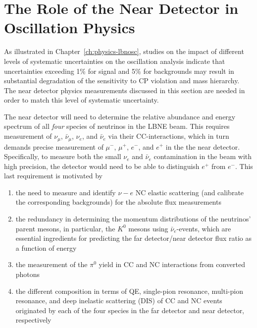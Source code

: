 \section{The Role of the Near Detector in Oscillation Physics} 
\label{sec-nd-oscl} 

As illustrated in Chapter~\ref{ch:physics-lbnosc}, studies on the
impact of different levels of systematic uncertainties on the
oscillation analysis indicate that uncertainties exceeding 1\% for
signal and 5\% for backgrounds may result in substantial degradation
of the sensitivity to CP violation and mass hierarchy.
The near detector physics measurements discussed in this section are
needed in order to match this level of systematic uncertainty.

The near detector will need to determine the relative abundance and
energy spectrum of all \textit{four} species of neutrinos in the LBNE
beam.
%
This requires measurement of $\nu_\mu$, $\bar \nu_\mu$, $\nu_e$, and
$\bar \nu_e$ via their CC-interactions, which in turn demands precise
measurement of $\mu^-$, $\mu^+$, $e^-$, and $e^+$ in the the near
detector. Specifically, to measure both the small $\nu_e$ and $\bar
\nu_e$ contamination in the beam with high precision, the detector
would need to be able to distinguish $e^+$ from $e^-$.  This last
requirement is motivated by
\begin{enumerate}
\item the need to measure and identify $\nu - e$ NC elastic scattering
  (and calibrate the corresponding backgrounds) for the absolute flux
  measurements
\item the redundancy in determining the momentum distributions of the
  neutrinos' parent mesons, in particular, the $K^0$ mesons using $\bar
  \nu_e$-events, which are essential ingredients for predicting the
  far detector/near detector flux ratio as a function of energy
\item the measurement of the $\pi^0$ yield in CC and NC interactions 
from converted photons
\item the different composition in terms of QE, single-pion resonance,
  multi-pion resonance, and deep inelastic scattering (DIS) of CC and
  NC events originated by each of the four species in the far detector
  and near detector, respectively
\end{enumerate}


